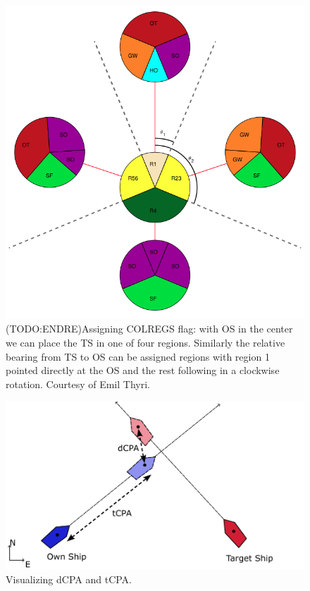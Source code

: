 \begin{figure}
    \centering
    \includegraphics[height=0.35\textheight]{Images/COLREGs_assess.png}
    \caption{(TODO:ENDRE)Assigning COLREGS flag: with OS in the center we can place the TS in one of four regions. Similarly the relative bearing from TS to OS can be assigned regions with region 1 pointed directly at the OS and the rest following in a clockwise rotation.
    Courtesy of Emil Thyri.}
    \label{FIG: COLREGs Classification}
\end{figure}

\begin{figure}
    \centering
    \includegraphics[width=\textwidth]{Images/shipCPA.pdf}
    \caption{Visualizing dCPA and tCPA.}
    \label{FIG: ship CPA}
\end{figure}



